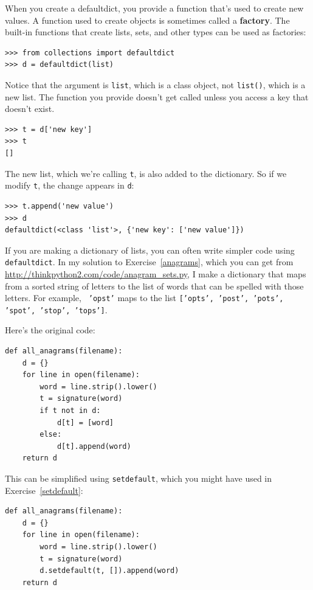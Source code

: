 \documentclass[10pt]{book}
\begin{document}
When you create a defaultdict, you provide a function that's used to
create new values.  A function used to create objects is sometimes
called a {\bf factory}.  The built-in functions that create lists, sets,
and other types can be used as factories:

\begin{verbatim}
>>> from collections import defaultdict
>>> d = defaultdict(list)
\end{verbatim}

Notice that the argument is {\tt list}, which is a class object,
not {\tt list()}, which is a new list.  The function you provide
doesn't get called unless you access a key that doesn't exist.

\begin{verbatim}
>>> t = d['new key']
>>> t
[]
\end{verbatim}

The new list, which we're calling {\tt t}, is also added to the
dictionary.  So if we modify {\tt t}, the change appears in {\tt d}:

\begin{verbatim}
>>> t.append('new value')
>>> d
defaultdict(<class 'list'>, {'new key': ['new value']})
\end{verbatim}

If you are making a dictionary of lists, you can often write simpler
code using {\tt defaultdict}.  In my solution to
Exercise~\ref{anagrams}, which you can get from
\url{http://thinkpython2.com/code/anagram_sets.py}, I make a
dictionary that maps from a sorted string of letters to the list of
words that can be spelled with those letters.  For example, {\tt
  'opst'} maps to the list {\tt ['opts', 'post', 'pots', 'spot',
    'stop', 'tops']}.

Here's the original code:

\begin{verbatim}
def all_anagrams(filename):
    d = {}
    for line in open(filename):
        word = line.strip().lower()
        t = signature(word)
        if t not in d:
            d[t] = [word]
        else:
            d[t].append(word)
    return d
\end{verbatim}

This can be simplified using {\tt setdefault}, which you might
have used in Exercise~\ref{setdefault}:

\begin{verbatim}
def all_anagrams(filename):
    d = {}
    for line in open(filename):
        word = line.strip().lower()
        t = signature(word)
        d.setdefault(t, []).append(word)
    return d
\end{verbatim}
\end{document}
